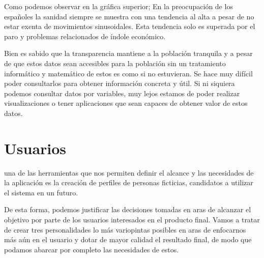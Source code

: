 Como podemos observar en la gráfica superior; En la preocupación de los españoles la sanidad siempre se muestra con una
tendencia al alta a pesar de no estar exenta de movimientos sinusoidales. Esta tendencia solo es superada por el paro y
problemas relacionados de índole económico.

Bien es sabido que la transparencia mantiene a la población tranquila y a pesar de que estos datos
sean accesibles para la población sin un tratamiento informático y matemático de estos es como si no estuvieran. Se hace
muy difícil poder consultarlos para obtener información concreta y útil. Si ni siquiera podemos consultar datos por
variables, muy lejos estamos de poder realizar visualizaciones o tener aplicaciones que sean capaces de obtener valor de
estos datos.

\section{Usuarios}
una de las herramientas que nos permiten definir el alcance y las necesidades de la aplicación es la creación de
perfiles de personas ficticias, candidatos a utilizar el sistema en un futuro.

De esta forma, podemos justificar las decisiones tomadas en aras de alcanzar el objetivo por parte de los usuarios
interesados en el producto final. Vamos a tratar de crear tres personalidades lo más variopintas posibles en aras
de enfocarnos más aún en el usuario y dotar de mayor calidad el resultado final, de modo que podamos abarcar por
completo las necesidades de estos.

